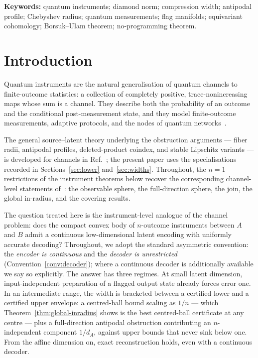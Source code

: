 \documentclass[11pt,a4paper]{article}
\begin{document}
\noindent\textbf{Keywords:} quantum instruments; diamond norm; compression width; antipodal profile; Chebyshev radius; quantum measurements; flag manifolds; equivariant cohomology; Borsuk--Ulam theorem; no-programming theorem.

\section{Introduction}
\label{sec:intro}

Quantum instruments are the natural generalisation of quantum channels to finite-outcome statistics: a collection of completely positive, trace-nonincreasing maps whose sum is a channel. They describe both the probability of an outcome and the conditional post-measurement state, and they model finite-outcome measurements, adaptive protocols, and the nodes of quantum networks~\cite{DaviesLewis1970,Ozawa1984,ChiribellaEtAl2009Instruments,ChiribellaEtAl2008Combs}.

The general source--latent theory underlying the obstruction arguments --- fiber radii, antipodal profiles, deleted-product coindex, and stable Lipschitz variants --- is developed for channels in Ref.~\cite{CompanionChannels}; the present paper uses the specialisations recorded in Sections~\ref{sec:lower} and~\ref{sec:widths}. Throughout, the $n=1$ restrictions of the instrument theorems below recover the corresponding channel-level statements of~\cite{CompanionChannels}: the observable sphere, the full-direction sphere, the join, the global in-radius, and the covering results.

The question treated here is the instrument-level analogue of the channel problem: does the compact convex body of $n$-outcome instruments between $A$ and $B$ admit a continuous low-dimensional latent encoding with uniformly accurate decoding? Throughout, we adopt the standard asymmetric convention: the \emph{encoder is continuous} and the \emph{decoder is unrestricted} (Convention~\ref{conv:decoder}); where a continuous decoder is additionally available we say so explicitly. The answer has three regimes. At small latent dimension, input-independent preparation of a flagged output state already forces error one. In an intermediate range, the width is bracketed between a certified lower and a certified upper envelope: a centred-ball bound scaling as $1/n$ --- which Theorem~\ref{thm:global-inradius} shows is the best centred-ball certificate at any centre --- plus a full-direction antipodal obstruction contributing an $n$-independent component $1/d_A$, against upper bounds that never sink below one. From the affine dimension on, exact reconstruction holds, even with a continuous decoder.
\end{document}

